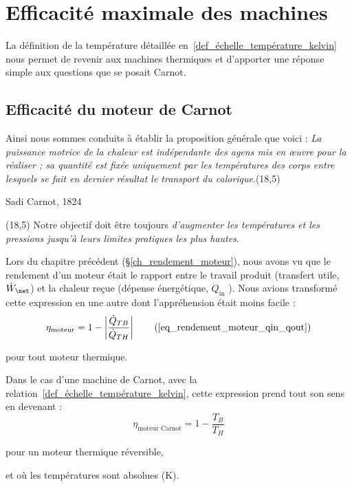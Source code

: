 \section{Efficacité maximale des machines}
\label{ch_efficacite_maximale_machines}
	
	La définition de la température détaillée en~\ref{def_échelle_température_kelvin} nous permet de revenir aux machines thermiques et d’apporter une réponse simple aux questions que se posait Carnot.

	\subsection{Efficacité du moteur de Carnot}
	\label{ch_efficacité_moteur_carnot}

			Ainsi nous sommes conduits à établir la proposition générale que voici :
\emph{La puissance motrice de la chaleur est indépendante des agens mis en œuvre pour la réaliser ; sa quantité est fixée uniquement par les températures des corps entre lesquels se fait en dernier résultat le transport du calorique}.\nolinebreak\makebox(18,5){\color{gray}}\par\vspace{-0.3cm}\begin{flushright}Sadi Carnot, 1824~\cite{carnot1824}\end{flushright}
		\makebox(18,5){\color{gray}}
			Notre objectif doit être toujours \emph{d’augmenter les températures et les pressions jusqu’à leurs limites pratiques les plus hautes}.

		Lors du chapitre précédent (\S\ref{ch_rendement_moteur}), nous avons vu que le rendement d’un moteur était le rapport entre le travail produit (transfert utile, $\dot W_\net$) et la chaleur reçue (dépense énergétique, $\dot Q_\text{in}$ ). Nous avions transformé cette expression en une autre dont l’appréhension était moins facile :
		\begin{equation}
			\eta _\text{moteur} = 1 - \left| \frac{\dot Q_{TB}}{\dot Q_{TH}} \right|	\tag{\ref{eq_rendement_moteur_qin_qout}}
		\end{equation}
		\begin{equationterms}
			\item pour tout moteur thermique.
		\end{equationterms}

		Dans le cas d’une machine de Carnot, avec la relation~\ref{def_échelle_température_kelvin}, cette expression prend tout son sens en devenant :
		\begin{equation}
			\eta_\text{moteur Carnot} = 1 - \frac{T_B}{T_H}
			\label{eq_efficacité_moteur_carnot_température}
		\end{equation}
		\begin{equationterms}
			\item pour un moteur thermique réversible,
			\item et où les températures sont absolues (\si{\kelvin}).
		\end{equationterms}

